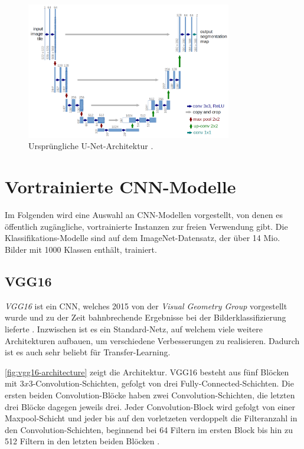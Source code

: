 \begin{figure}
	\centering
	\includegraphics[width=0.8\textwidth]{Bilder/u-net-architecture.png} 
	\caption{Ursprüngliche U-Net-Architektur \cite{Ronneberger.18052015}.}
	\label{fig:u-net-architecture}
\end{figure} 


\section{Vortrainierte \ac{CNN}-Modelle} \label{sec:pretrained-backbones}

Im Folgenden wird eine Auswahl an \ac{CNN}-Modellen vorgestellt, von denen es öffentlich zugängliche,
vortrainierte Instanzen zur freien Verwendung gibt. 
Die Klassifikations-Modelle sind auf dem ImageNet-Datensatz, der über 14 Mio. Bilder 
mit 1000 Klassen enthält, trainiert.    

\subsection{VGG16} \label{sec:pretrained-backbones:vgg16}

\textit{VGG16} ist ein \ac{CNN}, welches 2015 von der \textit{Visual Geometry Group} vorgestellt wurde 
und zu der Zeit bahnbrechende Ergebnisse bei der Bilderklassifizierung lieferte \cite{Simonyan.04092014}. 
Inzwischen ist es ein Standard-Netz, auf welchem viele weitere Architekturen aufbauen,
um verschiedene Verbesserungen zu realisieren. 
Dadurch ist es auch sehr beliebt für Transfer-Learning. 

\autoref{fig:vgg16-architecture} zeigt die Architektur. VGG16 besteht aus fünf Blöcken mit $3x3$-Convolution-Schichten,
gefolgt von drei Fully-Connected-Schichten. Die ersten beiden Convolution-Blöcke haben zwei Convolution-Schichten,
die letzten drei Blöcke dagegen jeweils drei. 
Jeder Convolution-Block wird gefolgt von einer Maxpool-Schicht und jeder bis auf den vorletzeten verdoppelt die Filteranzahl in den Convolution-Schichten,
beginnend bei 64 Filtern im ersten Block bis hin zu 512 Filtern in den letzten beiden Blöcken \cite{Simonyan.04092014}. 

